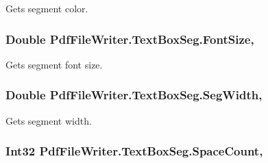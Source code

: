 Gets segment color. 

\subsubsection[{\texorpdfstring{Font\+Size}{FontSize}}]{\setlength{\rightskip}{0pt plus 5cm}Double Pdf\+File\+Writer.\+Text\+Box\+Seg.\+Font\+Size\hspace{0.3cm}{\ttfamily [get]}, {\ttfamily [set]}}\hypertarget{class_pdf_file_writer_1_1_text_box_seg_a3f47de35ffa9a9788e5c32ca18d2029a}{}\label{class_pdf_file_writer_1_1_text_box_seg_a3f47de35ffa9a9788e5c32ca18d2029a}


Gets segment font size. 

\subsubsection[{\texorpdfstring{Seg\+Width}{SegWidth}}]{\setlength{\rightskip}{0pt plus 5cm}Double Pdf\+File\+Writer.\+Text\+Box\+Seg.\+Seg\+Width\hspace{0.3cm}{\ttfamily [get]}, {\ttfamily [set]}}\hypertarget{class_pdf_file_writer_1_1_text_box_seg_ac65ff2afd9aff489c89c5f14fc92e8a5}{}\label{class_pdf_file_writer_1_1_text_box_seg_ac65ff2afd9aff489c89c5f14fc92e8a5}


Gets segment width. 

\subsubsection[{\texorpdfstring{Space\+Count}{SpaceCount}}]{\setlength{\rightskip}{0pt plus 5cm}Int32 Pdf\+File\+Writer.\+Text\+Box\+Seg.\+Space\+Count\hspace{0.3cm}{\ttfamily [get]}, {\ttfamily [set]}}\hypertarget{class_pdf_file_writer_1_1_text_box_seg_af28a7fbffcb70091e951bc29af2478b1}{}\label{class_pdf_file_writer_1_1_text_box_seg_af28a7fbffcb70091e951bc29af2478b1}


